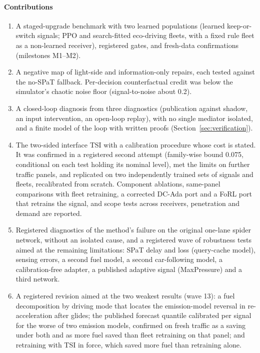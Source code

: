 \paragraph{Contributions}
\begin{enumerate}\setlength\itemsep{1pt}
\item A staged-upgrade benchmark with two learned populations (learned keep-or-switch signals; PPO and search-fitted eco-driving fleets,
with a fixed rule fleet as a non-learned receiver), registered gates, and fresh-data confirmations (milestones M1--M2).
\item A negative map of light-side and information-only repairs, each tested against the no-SPaT fallback. Per-decision counterfactual
credit was below the simulator's chaotic noise floor (signal-to-noise about 0.2).
\item A closed-loop diagnosis from three diagnostics (publication against shadow, an input intervention, an open-loop replay), with no
single mediator isolated, and a finite model of the loop with written proofs (Section~\ref{sec:verification}).
\item The two-sided interface TSI with a calibration procedure whose cost is stated. It was confirmed in a registered second attempt
(family-wise bound 0.075, conditional on each test holding its nominal level), met the limits on further traffic panels, and replicated
on two independently trained sets of signals and fleets, recalibrated from scratch. Component ablations, same-panel comparisons with fleet retraining, a corrected DC-Ada port and a FoRL port that retrains the signal, and scope
tests across receivers, penetration and demand are reported.
\item Registered diagnostics of the method's failure on the original one-lane spider network, without an isolated cause, and a registered wave of robustness tests aimed at the
remaining limitations: SPaT delay and loss (query-cache model), sensing errors, a second fuel model, a second car-following model, a calibration-free
adapter, a published adaptive signal (MaxPressure) and a third network.
\item A registered revision aimed at the two weakest results (wave 13): a fuel decomposition by driving mode that locates the
emission-model reversal in re-acceleration after glides; the published forecast quantile calibrated per signal for the worse of two
emission models, confirmed on fresh traffic as a saving under both and as more fuel saved than fleet retraining on that panel; and
retraining with TSI in force, which saved more fuel than retraining alone.
\end{enumerate}

